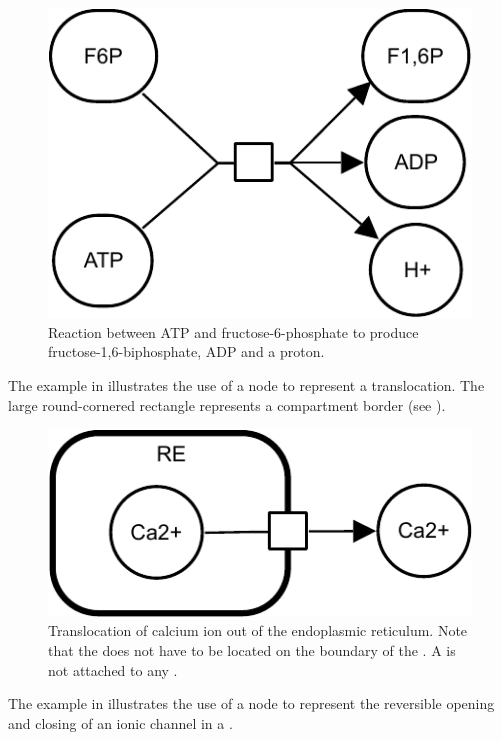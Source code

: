 \begin{figure}[H]
  \centering
  \includegraphics[scale = 0.8]{examples/process-reaction}
  \caption{Reaction between ATP and fructose-6-phosphate to produce fructose-1,6-biphosphate, ADP and a proton.}
  \label{fig:trans-react}
\end{figure}

The example in  illustrates the use of a  node to represent a translocation. The large round-cornered rectangle represents a compartment border (see ).

\begin{figure}[H]
  \centering
  \includegraphics[scale = 0.8]{examples/process-translocation}
  \caption{Translocation of calcium ion out of the endoplasmic reticulum. Note that the  does not have to be located on the boundary of the . A  is not attached to any .}
  \label{fig:trans-trans}
\end{figure}

The example in  illustrates the use of a  node to represent the reversible opening and closing of an ionic channel in a \PD.


